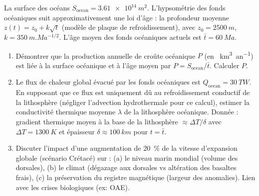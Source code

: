 \documentclass[11pt]{article}
\begin{document}
\begin{exercice}
La surface des océans $S_{\text{ocean}} = \SI{3,61e14}{m^2}$. L'hypsométrie des fonds océaniques suit approximativement une loi d'âge : la profondeur moyenne $z(t) = z_0 + k \sqrt{t}$ (modèle de plaque de refroidissement), avec $z_0 = \SI{2500}{m}$, $k = \SI{350}{m.Ma^{-1/2}}$. L'âge moyen des fonds océaniques actuels est $\bar{t} = \SI{60}{Ma}$.

\begin{enumerate}
    \item Démontrer que la production annuelle de croûte océanique $P$ (en \SI{}{km^3.an^{-1}}) est liée à la surface océanique et à l'âge moyen par $P = S_{\text{ocean}} / \bar{t}$. Calculer $P$.
    \item Le flux de chaleur global évacué par les fonds océaniques est $Q_{\text{ocean}} = \SI{30}{TW}$. En supposant que ce flux est uniquement dû au refroidissement conductif de la lithosphère (négliger l'advection hydrothermale pour ce calcul), estimer la conductivité thermique moyenne $\lambda$ de la lithosphère océanique. Donnée : gradient thermique moyen à la base de la lithosphère $\approx \Delta T / \delta$ avec $\Delta T = \SI{1300}{K}$ et épaisseur $\delta \approx \SI{100}{km}$ pour $t = \bar{t}$.
    \item Discuter l'impact d'une augmentation de \SI{20}{\%} de la vitesse d'expansion globale (scénario Crétacé) sur : (a) le niveau marin mondial (volume des dorsales), (b) le climat (dégazage  aux dorsales vs altération des basaltes frais), (c) la préservation du registre magnétique (largeur des anomalies). Lien avec les crises biologiques (ex: OAE).
\end{enumerate}
\end{exercice}
\end{document}
